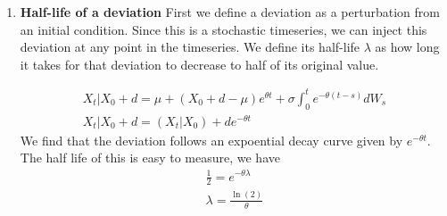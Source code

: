 \documentclass{article}
\begin{document}
\begin{enumerate}
\begin{gather*}
            \end{gather*}
            Since $X_t$ is composed of a gaussian, we
            know that $X_t$ is gaussian. We now solve for the mean and
            variance.
            \begin{gather*}
                E(X_t) = E\left(\mu - (X_0 - \mu)e^{-\theta t} + \sigma \int_0^t e^{-\theta
                (t - s)}dW_s\right)
                \\
                = \mu - (X_0 - \mu)e^{-\theta t} + E(\sigma \int_0^t e^{-\theta
                (t - s)}dW_s) 
                \\
                = \mu - (X_0 - \mu)e^{-\theta t}
            \end{gather*} 
            This is exactly equal to the deterministic component, $\alpha$, of
            our original random variable. Next we look at the variance. 
            \begin{gather*} 
                \Var(X_t) = E(X_t^2) - E(X_t)^2
                \\
                = E\left(\alpha^2 + 2\alpha\beta + \beta^2 \right)- \alpha^2
                \\
                =  E(\beta^2)
                \\
                = \frac{\sigma^2}{2\theta}\left[1 -  e^{-2\theta t}\right]
            \end{gather*}
            Using these mean and variance we find that the stationary
            distribution for $\lim_{t\to\infty} X_t$ is 
            \begin{gather*}
                \lim_{t\to\infty} X_t \sim N\left(\mu,
                \frac{\sigma^2}{2\theta}\right)
            \end{gather*}
        \item \textbf{Half-life of a deviation} First we define a deviation as a
        perturbation from an initial condition. Since this is a stochastic
        timeseries, we can inject this deviation at any point in the timeseries.
        We define its half-life $\lambda$ as how long it takes for that deviation to
        decrease to half of its original value. 

        \begin{gather*}
            X_t | X_0 + d = \mu + (X_0 + d - \mu) e^{\theta t} + \sigma
            \int_0^{t} e^{-\theta (t - s)}dW_s
            \\
            X_t | X_0 + d = \left(X_t | X_0\right) + d e^{-\theta t}
        \end{gather*}
        We find that the deviation follows an expoential decay curve given by
        $e^{-\theta t}$. The half life of this is easy to measure, we have
        \begin{gather*}
            \frac{1}{2} = e^{-\theta \lambda}
            \\
            \lambda = \frac{\ln(2)}{\theta}
        \end{gather*}


\end{enumerate}
\end{document}
